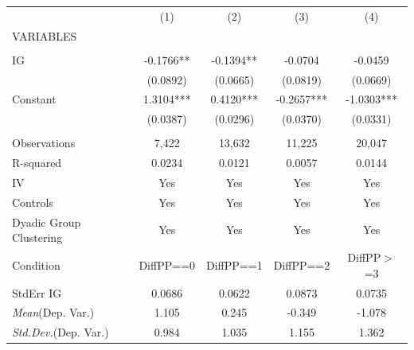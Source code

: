 \documentclass[]{article}
\begin{document}
\begin{tabular}{lcccc} \hline
 & (1) & (2) & (3) & (4) \\
VARIABLES &  &  &  &  \\ \hline
 &  &  &  &  \\
IG & -0.1766** & -0.1394** & -0.0704 & -0.0459 \\
 & (0.0892) & (0.0665) & (0.0819) & (0.0669) \\
Constant & 1.3104*** & 0.4120*** & -0.2657*** & -1.0303*** \\
 & (0.0387) & (0.0296) & (0.0370) & (0.0331) \\
 &  &  &  &  \\
Observations & 7,422 & 13,632 & 11,225 & 20,047 \\
R-squared & 0.0234 & 0.0121 & 0.0057 & 0.0144 \\
IV & Yes & Yes & Yes & Yes \\
Controls & Yes & Yes & Yes & Yes \\
Dyadic Group Clustering & Yes & Yes & Yes & Yes \\
Condition & DiffPP==0 & DiffPP==1 & DiffPP==2 & DiffPP$>$=3 \\
StdErr IG & 0.0686 & 0.0622 & 0.0873 & 0.0735 \\
\textit{Mean}(Dep. Var.) & 1.105 & 0.245 & -0.349 & -1.078 \\
 \textit{Std.Dev.}(Dep. Var.) & 0.984 & 1.035 & 1.155 & 1.362 \\ \hline
\end{tabular}
\end{document}
